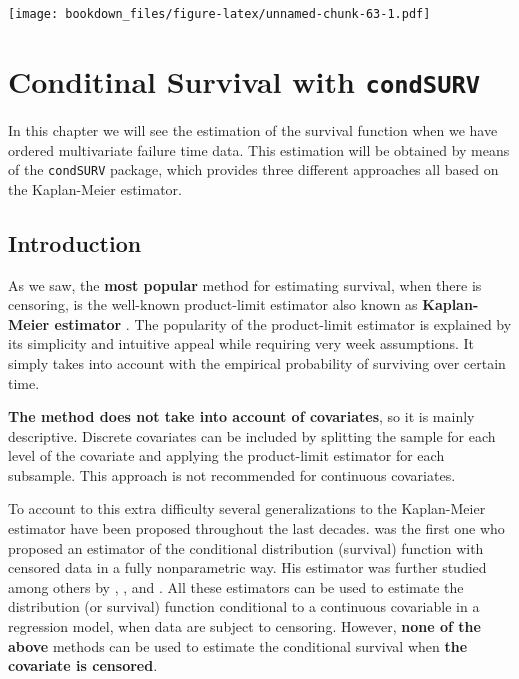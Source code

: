 \documentclass[]{book}
\theoremstyle{definition}
\theoremstyle{definition}
\theoremstyle{definition}
\theoremstyle{remark}
\begin{document}
\texttt{[image: bookdown\_files/figure-latex/unnamed-chunk-63-1.pdf]}

\chapter{\texorpdfstring{Conditinal Survival with
\texttt{condSURV}}{Conditinal Survival with condSURV}}\label{condsurv}

In this chapter we will see the estimation of the survival function when
we have ordered multivariate failure time data. This estimation will be
obtained by means of the \texttt{condSURV} package, which provides three
different approaches all based on the Kaplan-Meier estimator.

\section{Introduction}\label{introduction}

As we saw, the \textbf{most popular} method for estimating survival,
when there is censoring, is the well-known product-limit estimator also
known as \textbf{Kaplan-Meier estimator} \citep{KM58}. The popularity of
the product-limit estimator is explained by its simplicity and intuitive
appeal while requiring very week assumptions. It simply takes into
account with the empirical probability of surviving over certain time.

\textbf{The method does not take into account of covariates}, so it is
mainly descriptive. Discrete covariates can be included by splitting the
sample for each level of the covariate and applying the product-limit
estimator for each subsample. This approach is not recommended for
continuous covariates.

To account to this extra difficulty several generalizations to the
Kaplan-Meier estimator have been proposed throughout the last decades.
\citet{Beran81} was the first one who proposed an estimator of the
conditional distribution (survival) function with censored data in a
fully nonparametric way. His estimator was further studied among others
by \citet{Dabrowska87}, \citet{Akritas94}, \citet{Manteiga94} and
\citet{VanKeilegom2001}. All these estimators can be used to estimate
the distribution (or survival) function conditional to a continuous
covariable in a regression model, when data are subject to censoring.
However, \textbf{none of the above} methods can be used to estimate the
conditional survival when \textbf{the covariate is censored}.
\end{document}
